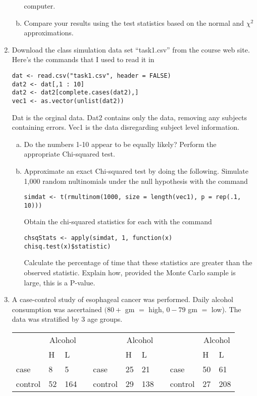 \documentclass[12pt]{article}
\begin{document}
\begin{enumerate}[Problem 1.]
\begin{enumerate}[a.]
    computer.
  \item Compare your results using the test statistics based on the
    normal and $\chi^2$ approximations.
\end{enumerate}
\item Download the class simulation data set ``task1.csv'' from the course
  web site. Here's the commands that I used to read it in
\begin{verbatim}
dat <- read.csv("task1.csv", header = FALSE)
dat2 <- dat[,1 : 10]
dat2 <- dat2[complete.cases(dat2),]
vec1 <- as.vector(unlist(dat2))
\end{verbatim}
  Dat is the orginal data. Dat2 contains only the data, removing any
  subjects containing errors. Vec1 is the data disregarding subject
  level information.
  \begin{enumerate}[a.]
  \item Do the numbers 1-10 appear to be equally likely? Perform
    the appropriate Chi-squared test.
  \item Approximate an exact Chi-squared test by doing the following.
    Simulate 1,000 random nultinomials under the null hypothesis with
    the command
\begin{verbatim}
simdat <- t(rmultinom(1000, size = length(vec1), p = rep(.1, 10)))
\end{verbatim}
    Obtain the chi-squared statistics for each with the command
\begin{verbatim}
chsqStats <- apply(simdat, 1, function(x) chisq.test(x)$statistic)
\end{verbatim}
    Calculate the percentage of time that these statistics are greater
    than the observed statistic. Explain how, provided the Monte Carlo
    sample is large, this is a P-value.
\end{enumerate}
\item A case-control study of esophageal cancer was performed.  Daily alcohol
consumption was ascertained $(80 +$ gm $=$ high, $0-79$ gm $=$ low). The data
was stratified by 3 age groups.
\begin{center}
\begin{tabular}{lllclllclll}
& \multicolumn{2}{c}{Alcohol} &&& \multicolumn{2}{c}{Alcohol}
&& &\multicolumn{2}{c}{Alcohol} \\
& H & L & && H & L &&& H & L \\
case & 8 & 5 && case & 25 & 21& & case & 50 & 61 \\
control & 52 & 164 && control & 29 & 138& & control & 27 & 208 \vspace{+0.25in} \\

\end{tabular}
\end{center}
\end{enumerate}
\end{document}
